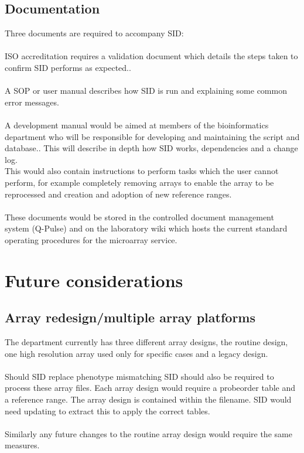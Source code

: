 \subsection{Documentation}
Three documents are required to accompany SID:
\paragraph*{}
ISO accreditation requires a validation document which details the steps taken to confirm SID performs as expected..
\paragraph*{}
A SOP or user manual describes how SID is run and explaining some common error messages.
\paragraph*{}
A development manual would be aimed at members of the bioinformatics department who will be responsible for developing and maintaining the script and database.. This will describe in depth how SID works, dependencies and a change log. 
\\
This would also contain instructions to perform tasks which the user cannot perform, for example completely removing arrays to enable the array to be reprocessed and creation and adoption of new reference ranges.
\paragraph*{}
These documents would be stored in the controlled document management system (Q-Pulse) and on the laboratory wiki which hosts the current standard operating procedures for the microarray service.

\section{Future considerations}
\subsection{Array redesign/multiple array platforms}
The department currently has three different array designs, the routine design, one high resolution array used only for specific cases and a legacy design. 
\paragraph*{}
Should SID replace phenotype mismatching SID should also be required to process these array files. Each array design would require a probeorder table and a reference range. The array design is contained within the filename. SID would need updating to extract this to apply the correct tables.
\paragraph*{}
Similarly any future changes to the routine array design would require the same measures.